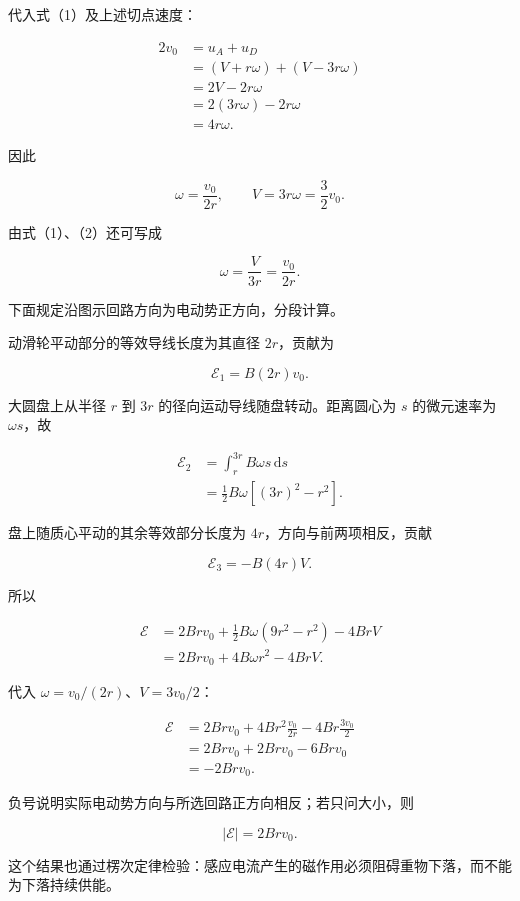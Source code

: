 \documentclass[12pt,a4paper,UTF8]{ctexart}
\begin{document}
代入式（1）及上述切点速度：

\[
\begin{aligned}
2v_0
&=u_A+u_D\\
&=(V+r\omega)+(V-3r\omega)\\
&=2V-2r\omega\\
&=2(3r\omega)-2r\omega\\
&=4r\omega.
\end{aligned}
\]

因此

\[
\omega=\frac{v_0}{2r},
\qquad
\boxed{V=3r\omega=\frac32v_0}.\tag{2}
\]

由式（1）、（2）还可写成

\[\omega=\frac{V}{3r}=\frac{v_0}{2r}.\tag{3}\]

下面规定沿图示回路方向为电动势正方向，分段计算。

动滑轮平动部分的等效导线长度为其直径 \(2r\)，贡献为

\[\mathcal E_1=B(2r)v_0.\]

大圆盘上从半径 \(r\) 到 \(3r\) 的径向运动导线随盘转动。距离圆心为 \(s\)
的微元速率为 \(\omega s\)，故

\[
\begin{aligned}
\mathcal E_2
&=\int_r^{3r}B\omega s\,\mathrm ds\\
&=\frac12B\omega[(3r)^2-r^2].
\end{aligned}
\]

盘上随质心平动的其余等效部分长度为 \(4r\)，方向与前两项相反，贡献

\[\mathcal E_3=-B(4r)V.\]

所以

\[
\begin{aligned}
\mathcal E
&=2Brv_0+\frac12B\omega(9r^2-r^2)-4BrV\\
&=2Brv_0+4B\omega r^2-4BrV.
\end{aligned}
\]

代入 \(\omega=v_0/(2r)\)、\(V=3v_0/2\)：

\[
\begin{aligned}
\mathcal E
&=2Brv_0+4Br^2\frac{v_0}{2r}-4Br\frac{3v_0}{2}\\
&=2Brv_0+2Brv_0-6Brv_0\\
&=\boxed{-2Brv_0}.
\end{aligned}
\]

负号说明实际电动势方向与所选回路正方向相反；若只问大小，则

\[\boxed{|\mathcal E|=2Brv_0}.\]

这个结果也通过楞次定律检验：感应电流产生的磁作用必须阻碍重物下落，而不能为下落持续供能。
\end{document}

